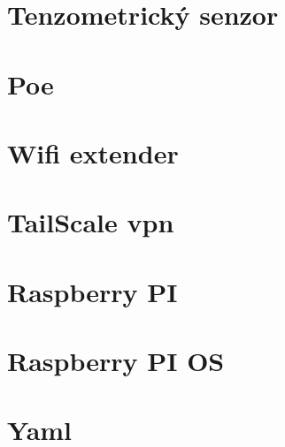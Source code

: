 \section{Tenzometrický senzor}
\section{Poe}
\section{Wifi extender}
\section{TailScale vpn}
\section{Raspberry PI}
\section{Raspberry PI OS}
\section{Yaml}




